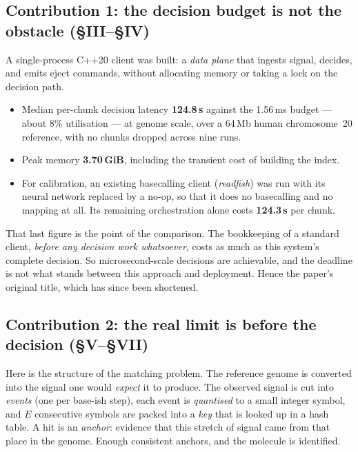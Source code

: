 \documentclass[11pt,a4paper]{article}
\begin{document}
\subsection*{Contribution 1: the decision budget is not the obstacle \hfill\small(§III--§IV)}

A single-process C++20 client was built: a \emph{data plane} that ingests signal, decides, and
emits eject commands, without allocating memory or taking a lock on the decision path.

\begin{itemize}
\item Median per-chunk decision latency \textbf{124.8\,\textmu s} against the 1.56\,ms budget
      --- about 8\% utilisation --- at genome scale, over a 64\,Mb human chromosome~20
      reference, with no chunks dropped across nine runs.
\item Peak memory \textbf{3.70\,GiB}, including the transient cost of building the index.
\item For calibration, an existing basecalling client (\emph{readfish}) was run with its
      neural network replaced by a no-op, so that it does no basecalling and no mapping at
      all. Its remaining orchestration alone costs \textbf{124.3\,\textmu s} per chunk.
\end{itemize}

That last figure is the point of the comparison. The bookkeeping of a standard client,
\emph{before any decision work whatsoever}, costs as much as this system's complete decision.
So microsecond-scale decisions are achievable, and the deadline is not what stands between
this approach and deployment. Hence the paper's original title, which has since been
shortened.

\subsection*{Contribution 2: the real limit is before the decision \hfill\small(§V--§VII)}

Here is the structure of the matching problem. The reference genome is converted into the
signal one would \emph{expect} it to produce. The observed signal is cut into \emph{events}
(one per base-ish step), each event is \emph{quantised} to a small integer symbol, and $E$
consecutive symbols are packed into a \emph{key} that is looked up in a hash table. A hit is
an \emph{anchor}: evidence that this stretch of signal came from that place in the genome.
Enough consistent anchors, and the molecule is identified.
\end{document}
